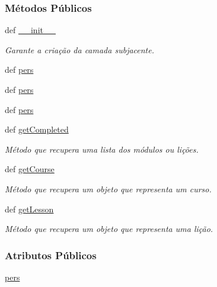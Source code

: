 \subsubsection*{Métodos Públicos}
\begin{DoxyCompactItemize}
\item 
def \hyperlink{classCourse_1_1CourseUnit_1_1IfBusCourse_ad2920d0a7dcd1838f1220f644e8244e5}{\-\_\-\-\_\-init\-\_\-\-\_\-}
\begin{DoxyCompactList}\small\item\em Garante a criação da camada subjacente. \end{DoxyCompactList}\item 
def \hyperlink{classCourse_1_1CourseUnit_1_1IfBusCourse_adf5702dec1a99bbb31936b7f1d425a40}{pers}
\item 
def \hyperlink{classCourse_1_1CourseUnit_1_1IfBusCourse_adf5702dec1a99bbb31936b7f1d425a40}{pers}
\item 
def \hyperlink{classCourse_1_1CourseUnit_1_1IfBusCourse_adf5702dec1a99bbb31936b7f1d425a40}{pers}
\item 
def \hyperlink{classCourse_1_1CourseUnit_1_1IfBusCourse_ae83d657f3a281dd8a9ade3e7a9db0659}{get\-Completed}
\begin{DoxyCompactList}\small\item\em Método que recupera uma lista dos módulos ou lições. \end{DoxyCompactList}\item 
def \hyperlink{classCourse_1_1CourseUnit_1_1IfBusCourse_a26af1b8d56c117b45a9ef3d1dcfbd3a9}{get\-Course}
\begin{DoxyCompactList}\small\item\em Método que recupera um objeto que representa um curso. \end{DoxyCompactList}\item 
def \hyperlink{classCourse_1_1CourseUnit_1_1IfBusCourse_a62f1a9a39f82736721c32ffaac16798c}{get\-Lesson}
\begin{DoxyCompactList}\small\item\em Método que recupera um objeto que representa uma lição. \end{DoxyCompactList}\end{DoxyCompactItemize}
\subsubsection*{Atributos Públicos}
\begin{DoxyCompactItemize}
\item 
\hyperlink{classCourse_1_1CourseUnit_1_1IfBusCourse_ab926ae8fb127b7697e2b63025df09a78}{pers}
\end{DoxyCompactItemize}


